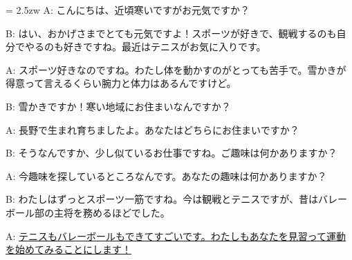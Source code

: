 \documentclass[11pt]{amsart}
\title{}
\author{}
\newenvironment{hangall}[1]{\hangindent = 2.5zw\everypar{\hangindent = 2.5zw}}{}
\begin{document}
\maketitle
\begin{hangall}{}%
A: こんにちは、近頃寒いですがお元気ですか？

B: はい、おかげさまでとても元気ですよ！スポーツが好きで、観戦するのも自分でやるのも好きですね。最近はテニスがお気に入りです。

A: スポーツ好きなのですね。わたし体を動かすのがとっても苦手で。雪かきが得意って言えるくらい腕力と体力はあるんですけど。

B: 雪かきですか！寒い地域にお住まいなんですか？

A: 長野で生まれ育ちましたよ。あなたはどちらにお住まいですか？

B: そうなんですか、少し似ているお仕事ですね。ご趣味は何かありますか？

A: 今趣味を探しているところなんです。あなたの趣味は何かありますか？

B: わたしはずっとスポーツ一筋ですね。今は観戦とテニスですが、昔はバレーボール部の主将を務めるほどでした。

A: \ul{テニスもバレーボールもできてすごいです。わたしもあなたを見習って運動を始めてみることにします！}\end{hangall}
\end{document}
